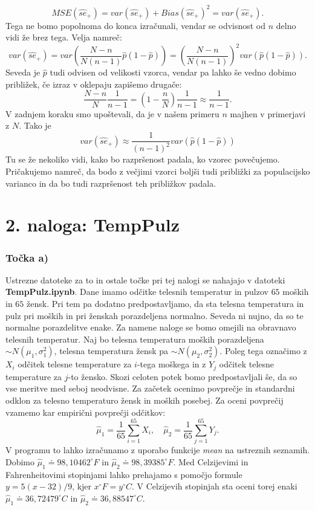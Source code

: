 \documentclass[12pt, letterpaper]{article}
\begin{document}
\[
MSE(\hat{se}_+) = var(\hat{se}_+) + Bias(\hat{se}_+)^2 = var(\hat{se}_+).
\]
Tega ne bomo popolnoma do konca izračunali, vendar se odvisnost od $n$ delno vidi že brez tega. Velja namreč:
\[
var(\hat{se}_+) = var\left(\frac{N-n}{N(n-1)}\hat{p}(1 - \hat{p})\right) = \left(\frac{N-n}{N(n-1)}\right)^2 var(\hat{p}(1 - \hat{p})).
\]
Seveda je $\hat{p}$ tudi odvisen od velikosti vzorca, vendar pa lahko še vedno dobimo približek, če izraz v oklepaju zapišemo drugače:
\[
\frac{N-n}{N}\frac{1}{n-1} = \left(1 - \frac{n}{N}\right)\frac{1}{n-1} \approx \frac{1}{n-1}.
\]
V zadnjem koraku smo upoštevali, da je v našem primeru $n$ majhen v primerjavi z $N$. Tako je
\[
var(\hat{se}_+) \approx \frac{1}{(n-1)^2}var(\hat{p}(1 - \hat{p}))
\]
Tu se že nekoliko vidi, kako bo razpršenost padala, ko vzorec povečujemo. Pričakujemo namreč, da bodo z večjimi vzorci boljši tudi približki za populacijsko varianco in da bo tudi razpršenost teh približkov padala.

\section*{2. naloga: TempPulz}

\subsubsection*{Točka a)} Ustrezne datoteke za to in ostale točke pri tej nalogi se nahajajo v datoteki \textbf{TempPulz.ipynb}. Dane imamo odčitke telesnih temperatur in pulzov $65$ moških in $65$ žensk. Pri tem pa dodatno predpostavljamo, da sta telesna temperatura in pulz pri moških in pri ženskah porazdeljena normalno. Seveda ni nujno, da so te normalne porazdelitve enake. Za namene naloge se bomo omejili na obravnavo telesnih temperatur. Naj bo telesna temperatura moških porazdeljena $\sim N(\mu_1, \sigma^2_1)$, telesna temperatura žensk pa $\sim N(\mu_2,\sigma^2_2)$. Poleg tega označimo z $X_i$ odčitek telesne temperature za $i$-tega moškega in z $Y_j$ odčitek telesne temperature za $j$-to žensko. Skozi celoten potek bomo predpostavljali še, da so vse meritve med seboj neodvisne. Za začetek ocenimo povprečje in standardni odklon za telesno temperaturo žensk in moških posebej. Za oceni povprečij vzamemo kar empirični povprečji odčitkov:
\[
\hat{\mu}_1 = \frac{1}{65}\sum_{i=1}^{65} X_i, \quad \hat{\mu}_2 = \frac{1}{65}\sum_{j=1}^{65} Y_j.
\]
V programu to lahko izračunamo z uporabo funkcije \emph{mean} na ustreznih seznamih. Dobimo $\hat{\mu}_1 \doteq 98,10462^{\circ}F$ in $\hat{\mu}_2 \doteq 98,39385^{\circ}F$. Med Celzijevimi in Fahrenheitovimi stopinjami lahko prehajamo s pomočjo formule $y = 5(x-32)/9$, kjer $x^{\circ}F = y^{\circ}C$. V Celzijevih stopinjah sta oceni torej enaki $\hat{\mu}_1 \doteq 36,72479^{\circ}C$ in $\hat{\mu}_2 \doteq 36,88547^{\circ}C$.
\end{document}
